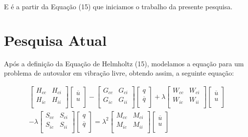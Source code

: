 \documentclass[a4paper,12p]{article}
\begin{document}
	
	E é a partir da Equação (15) que iniciamos o trabalho da presente pesquisa.	

	\section{Pesquisa Atual}
	Após a definição da Equação de Helmholtz (15), modelamos a equação para um problema de autovalor em vibração livre, obtendo assim, a seguinte equação:
	
	\begin{equation}
	\begin{gathered}
	\begin{bmatrix}
	H_{cc}  & H_{ci} \\
	H_{ic} & H_{ii} \\
	\end{bmatrix}
	\begin{bmatrix}
	\overline{u}\\
	u\\
	\end{bmatrix}
	-
	\begin{bmatrix}
	G_{cc}  & G_{ci} \\
	G_{ic} & G_{ii} \\
	\end{bmatrix}
	\begin{bmatrix}
	q\\
	\overline{q}\\
	\end{bmatrix}
	+\lambda
	\begin{bmatrix}
	W_{cc} & W_{ci} \\
	W_{ic} & W_{ii} \\
	\end{bmatrix}
	\begin{bmatrix}
	\overline{u}\\
	u\\
	\end{bmatrix}
	\\
	-\lambda
	\begin{bmatrix}
	S_{cc} & S_{ci} \\
	S_{ic} & S_{ii} \\
	\end{bmatrix}
	\begin{bmatrix}
	q\\
	\overline{q}\\
	\end{bmatrix}	
	=
	\lambda^{2}
	\begin{bmatrix}
	M_{cc} & M_{ci} \\
	M_{ic} & M_{ii} \\
	\end{bmatrix}
	\begin{bmatrix}
	\overline{u}\\
	u\\
	\end{bmatrix}
	\end{gathered}
	\end{equation}
	
\end{document}
